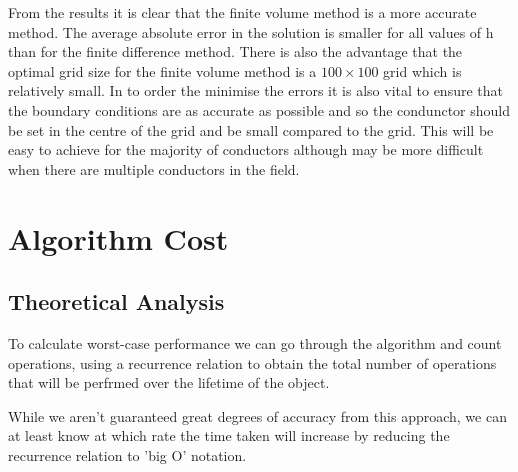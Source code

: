 \documentclass[aps,twocolumn,pre,nofootinbib,10pt]{revtex4-1}
\begin{document}
From the results it is clear that the finite volume method is a more accurate method. The average absolute error in the solution is smaller for all values of h than for the finite difference method. There is also the advantage that the optimal grid size for the finite volume method is a $100 \times 100$ grid which is relatively small.
In to order the minimise the errors it is also vital to ensure that the boundary conditions are as accurate as possible and so the condunctor should be set in the centre of the grid and be small compared to the grid. This will be easy to achieve for the majority of conductors although may be more difficult when there are multiple conductors in the field.

\section{Algorithm Cost}
\subsection{Theoretical Analysis}

To calculate worst-case performance we can go through the algorithm and count operations, using a recurrence relation to obtain the total number of operations that will be perfrmed over the lifetime of the object.

While we aren't guaranteed great degrees of accuracy from this approach, we can at least know at which rate the time taken will increase by reducing the recurrence relation to 'big O' notation.
\end{document}
